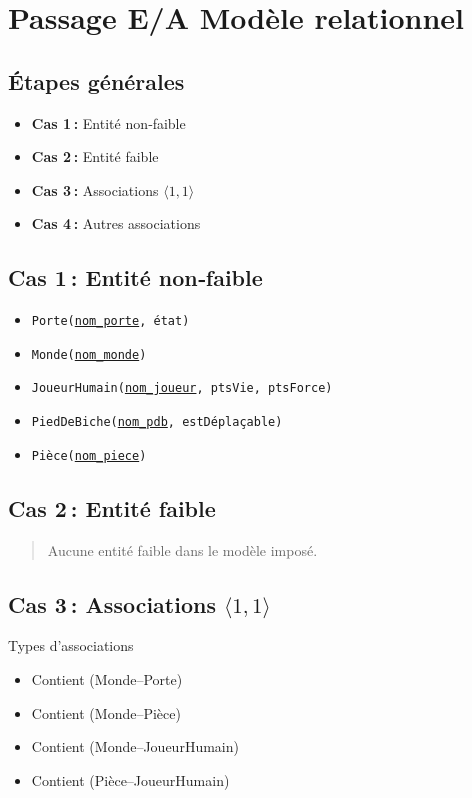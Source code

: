 

\newcommand{\ucode}[1]{\underline{\texttt{#1}}}

\section{Passage E/A \textrightarrow{} Modèle relationnel}

\subsection{Étapes générales}

\footnotesize
\begin{itemize}
  \item \textbf{Cas 1 :} Entité non‑faible  
  \item \textbf{Cas 2 :} Entité faible  
  \item \textbf{Cas 3 :} Associations $\langle1,1\rangle$  
  \item \textbf{Cas 4 :} Autres associations  
\end{itemize}

\subsection{Cas 1 : Entité non‑faible}
\begin{itemize}
  \item \texttt{Porte(}\ucode{nom\_porte}\texttt{, état)}  
  \item \texttt{Monde(}\ucode{nom\_monde}\texttt{)}  
  \item \texttt{JoueurHumain(}\ucode{nom\_joueur}\texttt{, ptsVie, ptsForce)}  
  \item \texttt{PiedDeBiche(}\ucode{nom\_pdb}\texttt{, estDéplaçable)}  
  \item \texttt{Pièce(}\ucode{nom\_piece}\texttt{)}  
\end{itemize}

\subsection{Cas 2 : Entité faible}
\begin{quote}
Aucune entité faible dans le modèle imposé.
\end{quote}

\subsection{Cas 3 : Associations $\langle1,1\rangle$}
Types d’associations
\begin{itemize}
  \item Contient (Monde–Porte)  
  \item Contient (Monde–Pièce)  
  \item Contient (Monde–JoueurHumain)  
  \item Contient (Pièce–JoueurHumain)  
\end{itemize}

